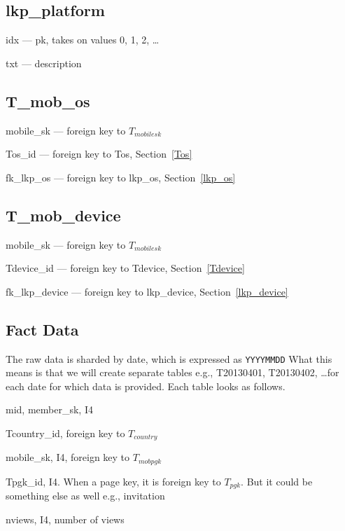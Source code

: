 \subsection{lkp\_platform}
\label{lkp_platform}
\be
\item idx --- pk, takes on values 0, 1, 2, \ldots
\item txt --- description
\ee
\subsection{T\_mob\_os}
\label{T_mob_os}
\be
\item mobile\_sk --- foreign key to \(T_{mobilesk}\)
\item Tos\_id --- foreign key to Tos, Section~\ref{Tos}
\item fk\_lkp\_os --- foreign key to lkp\_os, Section~\ref{lkp_os}
\ee
\subsection{T\_mob\_device}
\label{T_mob_device}
\be
\item mobile\_sk --- foreign key to \(T_{mobilesk}\)
\item Tdevice\_id --- foreign key to Tdevice, Section~\ref{Tdevice}
\item fk\_lkp\_device --- foreign key to lkp\_device,
  Section~\ref{lkp_device}
\ee

\subsection{Fact Data}
\label{Fact_Data}

The raw data is sharded by date, which is expressed as \verb+YYYYMMDD+
What this means is that we will create separate tables e.g., T20130401,
T20130402, \ldots for each date for which data is provided. Each
table looks as follows. 

\be
\item mid, member\_sk, I4
\item Tcountry\_id, foreign key to \(T_{country}\)
\item mobile\_sk, I4, foreign key to \(T_{mobpgk}\)
\item Tpgk\_id, I4. When a page key, it is foreign key to \(T_{pgk}\).
But it could be something else as well e.g., invitation
\item nviews, I4, number of views
\ee

